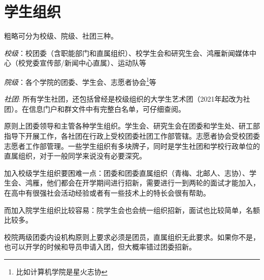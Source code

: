 \section{学生组织}


粗略可分为校级、院级、社团三种。

\emph{校级}：校团委（含职能部门和直属组织）、校学生会和研究生会、鸿雁新闻媒体中心（校党委宣传部/新闻中心直属）、运动队等


\emph{院级}：各个学院的团委、学生会、志愿者协会\footnote{比如计算机学院是星火志协}等

\emph{社团}: 所有学生社团，还包括曾经是校级组织的大学生艺术团（2021年起改为社团）。在信息门户和群文件中有完整白名单，可仔细查阅。

原则上团委领导和主管各种学生组织。学生会、研究生会在团委和学生处、研工部指导下开展工作，各社团在行政上受校团委社团工作部管辖。志愿者协会受校团委志愿者工作部管理。一些学生组织有多块牌子，同时是学生社团和学校行政单位的直属组织，对于一般同学来说没有必要深究。




加入校级学生组织要困难一点：团委和团委直属组织（青梅、北邮人、志协）、学生会、鸿雁，他们都会在开学期间进行招新，需要进行一到两轮的面试才能加入，在高中有很强社会活动经验或者有一些技术上的特长会很有帮助。

而加入院学生组织比较容易：院学生会也会统一组织招新，面试也比较简单，名额比较多。

校院两级团委内设机构原则上要求必须是团员，直属组织无此要求。如果你不是，也可以开学的时候和导员申请入团，但大概率错过团委招新。

